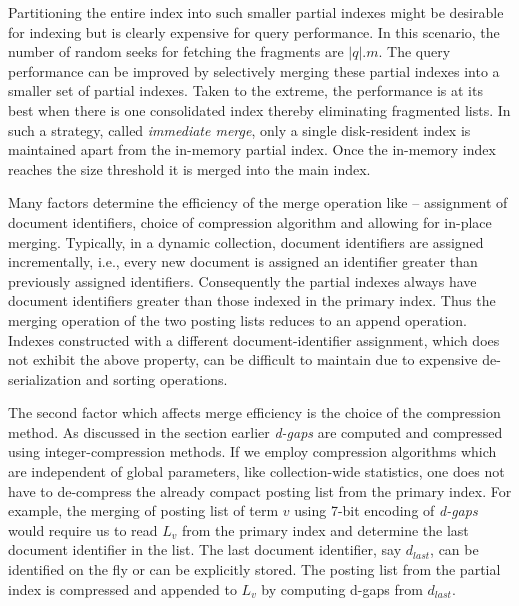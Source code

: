 Partitioning the entire index into such smaller partial indexes might be desirable for indexing but is clearly expensive for query performance. In this scenario, the number of random seeks for fetching the fragments are $|q|.m$. The query performance can be improved by selectively merging these partial indexes into a smaller set of partial indexes. Taken to the extreme, the performance is at its best when there is one consolidated index thereby eliminating fragmented lists. In such a strategy, called \emph{immediate merge}, only a single disk-resident index is maintained apart from the in-memory partial index. Once the in-memory index reaches the size threshold it is merged into the main index. 

Many factors determine the efficiency of the merge operation like -- assignment of document identifiers, choice of compression algorithm and allowing for in-place merging. Typically, in a dynamic collection, document identifiers are assigned incrementally, i.e., every new document is assigned an identifier greater than previously assigned identifiers. Consequently the partial indexes always have document identifiers greater than those indexed in the primary index. Thus the merging operation of the two posting lists reduces to an append operation. Indexes constructed with a different document-identifier assignment, which does not exhibit the above property, can be difficult to maintain due to expensive de-serialization and sorting operations.

The second factor which affects merge efficiency is the choice of the compression method. As discussed in the section earlier \emph{d-gaps} are computed and compressed using integer-compression methods. If we employ compression algorithms which are independent of global parameters, like collection-wide statistics, one does not have to de-compress the already compact posting list from the primary index. For example, the merging of posting list of term $v$ using 7-bit encoding of \emph{d-gaps} would require us to read $L_v$ from the primary index and determine the last document identifier in the list. The last document identifier, say $d_{last}$, can be identified on the fly or can be explicitly stored. The posting list from the partial index is compressed and appended to $L_v$ by computing d-gaps from $d_{last}$.

